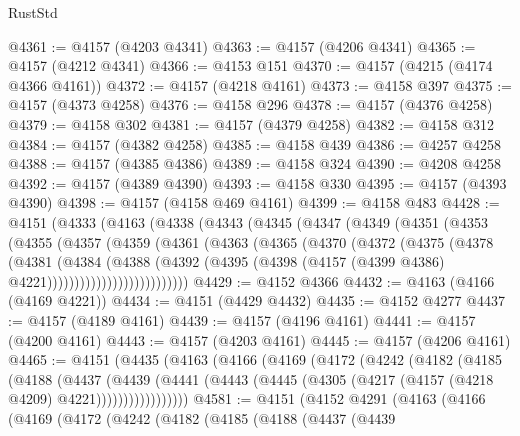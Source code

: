 \begin{lexlean}{RustStd}
\begin{coremodule}
@4361 := @4157 (@4203 @4341)
@4363 := @4157 (@4206 @4341)
@4365 := @4157 (@4212 @4341)
@4366 := @4153 @151
@4370 := @4157 (@4215 (@4174 @4366 @4161))
@4372 := @4157 (@4218 @4161)
@4373 := @4158 @397
@4375 := @4157 (@4373 @4258)
@4376 := @4158 @296
@4378 := @4157 (@4376 @4258)
@4379 := @4158 @302
@4381 := @4157 (@4379 @4258)
@4382 := @4158 @312
@4384 := @4157 (@4382 @4258)
@4385 := @4158 @439
@4386 := @4257 @4258
@4388 := @4157 (@4385 @4386)
@4389 := @4158 @324
@4390 := @4208 @4258
@4392 := @4157 (@4389 @4390)
@4393 := @4158 @330
@4395 := @4157 (@4393 @4390)
@4398 := @4157 (@4158 @469 @4161)
@4399 := @4158 @483
@4428 := @4151
    (@4333
      (@4163
        (@4338
          (@4343
            (@4345
              (@4347
                (@4349
                  (@4351
                    (@4353
                      (@4355
                        (@4357
                          (@4359
                            (@4361
                              (@4363
                                (@4365
                                  (@4370
                                    (@4372
                                      (@4375
                                        (@4378
                                          (@4381
                                            (@4384
                                              (@4388
                                                (@4392
                                                  (@4395
                                                    (@4398
                                                      (@4157
                                                        (@4399 @4386)
                                                        @4221))))))))))))))))))))))))))
@4429 := @4152 @4366
@4432 := @4163 (@4166 (@4169 @4221))
@4434 := @4151 (@4429 @4432)
@4435 := @4152 @4277
@4437 := @4157 (@4189 @4161)
@4439 := @4157 (@4196 @4161)
@4441 := @4157 (@4200 @4161)
@4443 := @4157 (@4203 @4161)
@4445 := @4157 (@4206 @4161)
@4465 := @4151
    (@4435
      (@4163
        (@4166
          (@4169
            (@4172
              (@4242
                (@4182
                  (@4185
                    (@4188
                      (@4437
                        (@4439
                          (@4441
                            (@4443 (@4445 (@4305 (@4217 (@4157 (@4218 @4209) @4221)))))))))))))))))
@4581 := @4151
    (@4152
      @4291
      (@4163
        (@4166
          (@4169
            (@4172
              (@4242
                (@4182
                  (@4185
                    (@4188
                      (@4437
                        (@4439

\end{coremodule}
\end{lexlean}
